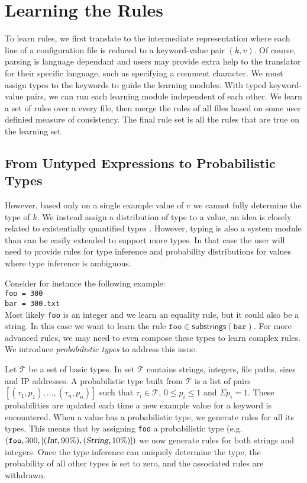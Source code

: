 \section{Learning the Rules}
\label{sec:system}

To learn rules, we first translate to the intermediate representation where each line of a configuration file is reduced to a keyword-value pair $(k,v)$.
Of course, parsing is language dependant and users may provide extra help to the translator for their specific language, such as specifying a comment character.
We must assign types to the keywords to guide the learning modules.
With typed keyword-value pairs, we can run each learning module independent of each other.
We learn a set of rules over a every file, then merge the rules of all files based on some user definied measure of consistency.
The final rule set is all the rules that are true on the learning set 

\subsection{From Untyped Expressions to Probabilistic Types}

However, based only on a single example value of $v$ we cannot fully determine the type of $k$.
We instead assign a distribution of type to a value, an idea is closely related to existentially quantified types \cite{Launchbury93lazyfunctional}.
However, typing is also a system module than can be easily extended to support more types. 
In that case the user will need to provide rules for type inference and probability distributions for values where type inference is ambiguous.

Consider for instance the following example:\\
\texttt{\hspace*{2em}foo = 300\\
\hspace*{2em}bar = 300.txt}\\
Most likely \texttt{foo} is an integer and we learn an equality rule, but it could also be a string.
In this case we want to learn the rule $ \texttt{foo} \in \textsf{substrings}(\texttt{bar})$. 
For more advanced rules, we may need to even compose these types to learn complex rules.
We introduce {\emph{probabilistic types}} to address this issue.

Let $\mathcal{T}$ be a set of basic types. In \app set $\mathcal{T}$ contains strings, integers, file paths, sizes and IP addresses. 
A probabilistic type built from $\mathcal{T}$ is a list of pairs $[(\tau_1, p_1),\ldots,(\tau_n, p_n)]$ such that $\tau_i \in \mathcal{T}$, 
$0 \le p_i \le 1$ 
and $\Sigma p_i = 1$. These probabilities are updated each time a new example value for a keyword is encountered.
When a value has a probabilistic type, we generate rules for all its types. This means that by assigning {\texttt{foo}} a probabilistic type 
(e.g. $(\texttt{foo}, 300, [(\textsl{Int},90\%),(\textsl{String},10\%)])$
we now generate rules for both strings and integers.
Once the type inference can uniquely determine the type, the probability of all other types is set to zero, and the associated rules are withdrawn.


